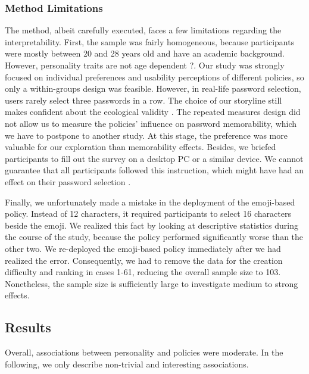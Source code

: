 \subsubsection{Method Limitations}
The method, albeit carefully executed, faces a few limitations regarding the interpretability. First, the sample was fairly homogeneous, because participants were mostly between 20 and 28 years old and have an academic background. However, personality traits are not age dependent \ar?. Our study was strongly focused on individual preferences and usability perceptions of different policies, so only a within-groups design was feasible. However, in real-life password selection, users rarely select three passwords in a row. The choice of our storyline still makes confident about the ecological validity \cite{Fahl2013EcologicalValidityPasswordStudy}. The repeated measures design did not allow us to measure the policies' influence on password memorability, which we have to postpone to another study. At this stage, the preference was more valuable for our exploration than memorability effects. Besides, we briefed participants to fill out the survey on a desktop PC or a similar device. We cannot guarantee that all participants followed this instruction, which might have had an effect on their password selection \cite{Melicher2016UsabilityMobileTextPasswords}. 

Finally, we unfortunately made a mistake in the deployment of the emoji-based policy. Instead of 12 characters, it required participants to select 16 characters beside the emoji. We realized this fact by looking at descriptive statistics during the course of the study, because the policy performed significantly worse than the other two. We re-deployed the emoji-based policy immediately after we had realized the error. Consequently, we had to remove the data for the creation difficulty and ranking in cases 1-61, reducing the overall sample size to 103. Nonetheless, the sample size is sufficiently large to investigate medium to strong effects. 


\subsection{Results}
Overall, associations between personality and policies were moderate. In the following, we only describe non-trivial and interesting associations. 


